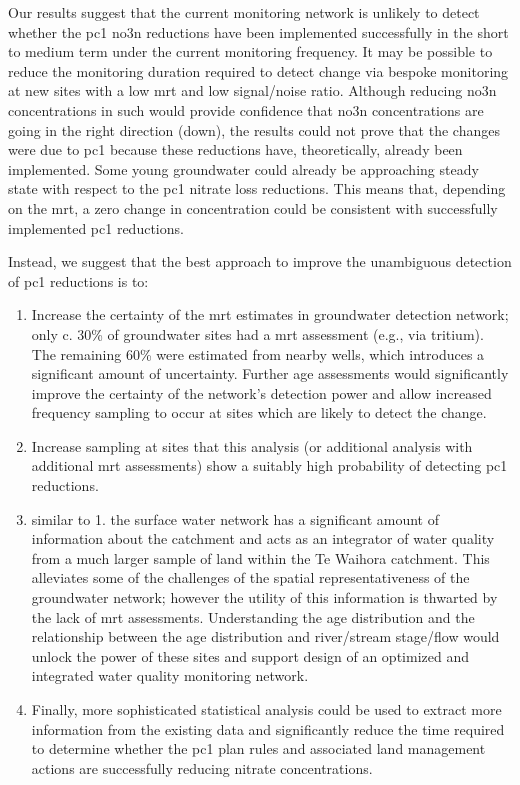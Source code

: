 Our results suggest that the current monitoring network is unlikely to detect whether the \gls{pc1} \gls{no3n} reductions have been implemented successfully in the short to medium term under the current monitoring frequency.
It may be possible to reduce the monitoring duration required to detect change via bespoke monitoring at new sites with a low \gls{mrt} and low signal/noise ratio.
Although reducing \gls{no3n} concentrations in such would provide confidence that \gls{no3n} concentrations are going in the right direction (down), the results could not prove that the changes were due to \gls{pc1} because these reductions have, theoretically, already been implemented.
Some young groundwater could already be approaching steady state with respect to the \gls{pc1} nitrate loss reductions.
This means that, depending on the \gls{mrt}, a zero change in concentration could be consistent with successfully implemented \gls{pc1} reductions.

Instead, we suggest that the best approach to improve the unambiguous detection of \gls{pc1} reductions is to:
\begin{enumerate}
    \item Increase the certainty of the \gls{mrt} estimates in groundwater detection network; only c. 30\% of groundwater sites had a \gls{mrt} assessment (e.g., via tritium). The remaining 60\% were estimated from nearby wells, which introduces a significant amount of uncertainty. Further age assessments would significantly improve the certainty of the network's detection power and allow increased frequency sampling to occur at sites which are likely to detect the change.
    \item Increase sampling at sites that this analysis (or additional analysis with additional \gls{mrt} assessments) show a suitably high probability of detecting \gls{pc1} reductions.
    \item similar to 1. the surface water network has a significant amount of information about the catchment and acts as an integrator of water quality from a much larger sample of land within the Te Waihora catchment. This alleviates some of the challenges of the spatial representativeness of the groundwater network\citep{olw_guidance}; however the utility of this information is thwarted by the lack of \gls{mrt} assessments. Understanding the age distribution and the relationship between the age distribution and river/stream stage/flow would unlock the power of these sites and support design of an optimized and integrated water quality monitoring network.
    \item Finally, more sophisticated statistical analysis could be used to extract more information from the existing data and significantly reduce the time required to determine whether the \gls{pc1} plan rules and associated land management actions are successfully reducing nitrate concentrations.
\end{enumerate}